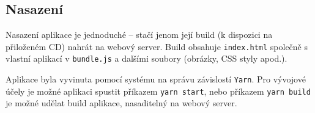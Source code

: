 \subsection{Nasazení}
Nasazení aplikace je jednoduché -- stačí jenom její build (k dispozici na přiloženém CD) nahrát na webový server. Build obsahuje \texttt{index.html} společně s vlastní aplikací v \texttt{bundle.js} a dalšími soubory (obrázky, CSS styly apod.).

Aplikace byla vyvinuta pomocí systému na správu závislostí \texttt{Yarn}. Pro vývojové účely je možné aplikaci spustit příkazem \texttt{yarn start}, nebo příkazem \texttt{yarn build} je možné udělat build aplikace, nasaditelný na webový server.